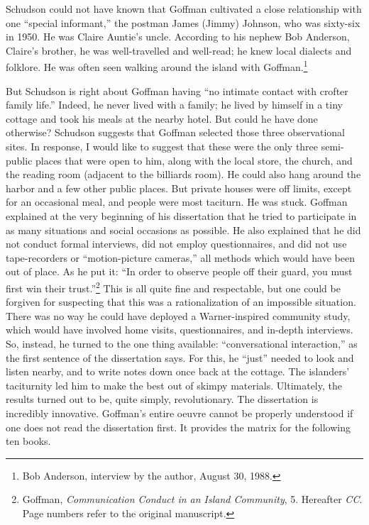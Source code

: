 \documentclass[twoside,symmetric,nobib,justified]{tufte-book}
\begin{document}
\noindent Schudson could not have known that Goffman cultivated a close
relationship with one ``special informant,'' the postman James (Jimmy)
Johnson, who was sixty-six in 1950. He was Claire Auntie's uncle.
According to his nephew Bob Anderson, Claire's brother, he was
well-travelled and well-read; he knew local dialects and folklore. He
was often seen walking around the island with Goffman.\footnote{Bob
  Anderson, interview by the author, August 30, 1988.}

But Schudson is right about Goffman having ``no intimate contact with
crofter family life.'' Indeed, he never lived with a family; he lived by
himself in a tiny cottage and took his meals at the nearby hotel. But
could he have done otherwise? Schudson suggests that Goffman selected
those three observational sites. In response, I would like to suggest
that these were the only three semi-public places that were open to him,
along with the local store, the church, and the reading room (adjacent
to the billiards room). He could also hang around the harbor and a few
other public places. But private houses were off limits, except for an
occasional meal, and people were most taciturn. He was stuck. Goffman
explained at the very beginning of his dissertation that he tried to
participate in as many situations and social occasions as possible. He
also explained that he did not conduct formal interviews, did not employ
questionnaires, and did not use tape-recorders or ``motion-picture
cameras,'' all methods which would have been out of place. As he put it:
``In order to observe people off their guard, you must first win their
trust.''\footnote{Goffman, \emph{Communication Conduct in an Island
  Community}, 5. Hereafter \emph{CC}. Page numbers refer to the original
  manuscript.} This is all quite fine and respectable, but one could be
forgiven for suspecting that this was a rationalization of an impossible
situation. There was no way he could have deployed a Warner-inspired
community study, which would have involved home visits, questionnaires,
and in-depth interviews. So, instead, he turned to the one thing
available: ``conversational interaction,'' as the first sentence of the
dissertation says. For this, he ``just'' needed to look and listen
nearby, and to write notes down once back at the cottage. The islanders'
taciturnity led him to make the best out of skimpy materials.
Ultimately, the results turned out to be, quite simply, revolutionary.
The dissertation is incredibly innovative. Goffman's entire oeuvre
cannot be properly understood if one does not read the dissertation
first. It provides the matrix for the following ten books.
\end{document}
